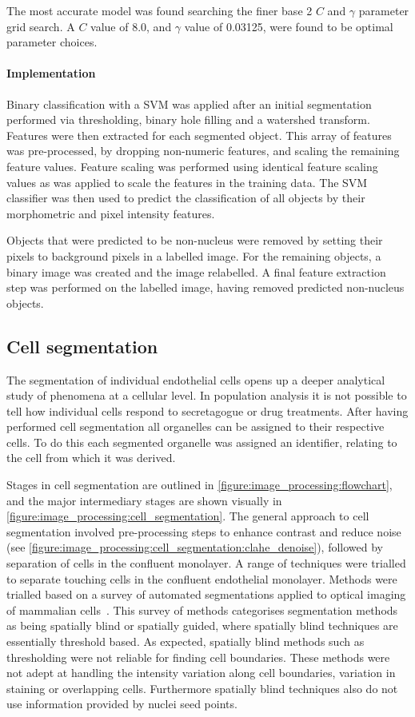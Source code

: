 The most accurate model was found searching the finer base 2 $C$ and $\gamma$ parameter grid search. A $C$ value of 8.0, and $\gamma$ value of 0.03125, were found to be optimal parameter choices.

\paragraph{Implementation}
Binary classification with a SVM was applied after an initial segmentation performed via thresholding, binary hole filling and a watershed transform. Features were then extracted for each segmented object. This array of features was pre-processed, by dropping non-numeric features, and scaling the remaining feature values. Feature scaling was performed using identical feature scaling values as was applied to scale the features in the training data. The SVM classifier was then used to predict the classification of all objects by their morphometric and pixel intensity features.

Objects that were predicted to be non-nucleus were removed by setting their pixels to background pixels in a labelled image. For the remaining objects, a binary image was created and the image relabelled. A final feature extraction step was performed on the labelled image, having removed predicted non-nucleus objects.

\subsection{Cell segmentation}
\label{endothelial_morphometry:image_processing:cell}
The segmentation of individual endothelial cells opens up a deeper analytical study of phenomena at a cellular level. In population analysis it is not possible to tell how individual cells respond to secretagogue or drug treatments. After having performed cell segmentation all organelles can be assigned to their respective cells. To do this each segmented organelle was assigned an identifier, relating to the cell from which it was derived.

Stages in cell segmentation are outlined in \autoref{figure:image_processing:flowchart}, and the major intermediary stages are shown visually in \autoref{figure:image_processing:cell_segmentation}. The general approach to cell segmentation involved pre-processing steps to enhance contrast and reduce noise (see \autoref{figure:image_processing:cell_segmentation:clahe_denoise}), followed by separation of cells in the confluent monolayer. A range of techniques were trialled to separate touching cells in the confluent endothelial monolayer. Methods were trialled based on a survey of automated segmentations applied to optical imaging of mammalian cells~\cite{Bajcsy2015}. This survey of methods categorises segmentation methods as being spatially blind or spatially guided, where spatially blind techniques are essentially threshold based. As expected, spatially blind methods such as thresholding were not reliable for finding cell boundaries. These methods were not adept at handling the intensity variation along cell boundaries, variation in staining or overlapping cells. Furthermore spatially blind techniques also do not use information provided by nuclei seed points.

